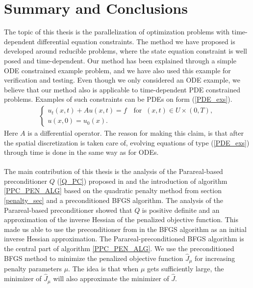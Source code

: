 \chapter{Summary and Conclusions} \label{summary chap}
The topic of this thesis is the parallelization of optimization problems with time-dependent differential equation constraints. The method we have proposed is developed around reducible problems, where the state equation constraint is well posed and time-dependent. Our method has been explained through a simple ODE constrained example problem, and we have also used this example for verification and testing. Even though we only considered an ODE example, we believe that our method also is applicable to time-dependent PDE constrained problems. Examples of such constraints can be PDEs on form (\ref{PDE_exs}).
\begin{align}
\left\{
     \begin{array}{lr}
       	u_t(x,t) + Au(x,t)=f \quad \textrm{for } \ (x,t)\in U\times(0,T),\\
       	u(x,0)=u_0(x).
     \end{array}
   \right. \label{PDE_exs}
\end{align}
Here $A$ is a differential operator. The reason for making this claim, is that after the spatial discretization is taken care of, evolving equations of type (\ref{PDE_exs}) through time is done in the same way as for ODEs. 
\\
\\
The main contribution of this thesis is the analysis of the Parareal-based preconditioner $Q$ (\ref{Q_PC}) proposed in \cite{maday2002parareal} and the introduction of algorithm \ref{PPC_PEN_ALG} based on the quadratic penalty method from section \ref{penalty_sec} and a preconditioned BFGS algorithm. The analysis of the Parareal-based preconditioner showed that $Q$ is positive definite and an approximation of the inverse Hessian of the penalized objective function. This made us able to use the preconditioner from \cite{maday2002parareal} in the BFGS algorithm as an initial inverse Hessian approximation. The Parareal-preconditioned BFGS algorithm is the central part of algorithm \ref{PPC_PEN_ALG}. We use the preconditioned BFGS method to minimize the penalized objective function $\hat J_{\mu}$ for increasing penalty parameters $\mu$. The idea is that when $\mu$ gets sufficiently large, the minimizer of $\hat J_{\mu}$ will also approximate the minimizer of $\hat J$.
\\
\\
